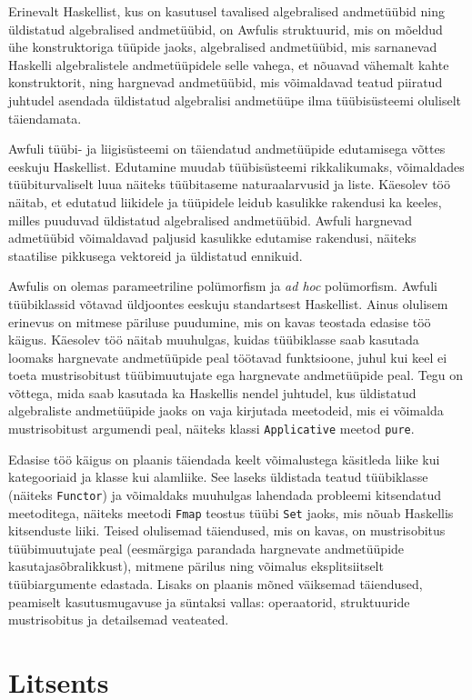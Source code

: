 \documentclass[12pt]{article}
\renewcommand\refname{Viidatud kirjandus}}
\newcommand\peatykktarn[1]{
  \clearpage
  \section*{#1}
  \addcontentsline{toc}{section}{#1}}
\begin{document}
    Erinevalt Haskellist, kus on kasutusel tavalised algebralised andmetüübid ning üldistatud algebralised andmetüübid, on Awfulis struktuurid, mis on mõeldud ühe konstruktoriga tüüpide jaoks, algebralised andmetüübid, mis sarnanevad Haskelli algebralistele andmetüüpidele selle vahega, et nõuavad vähemalt kahte konstruktorit, ning hargnevad andmetüübid, mis võimaldavad teatud piiratud juhtudel asendada üldistatud algebralisi andmetüüpe ilma tüübisüsteemi oluliselt täiendamata.

    Awfuli tüübi- ja liigisüsteemi on täiendatud andmetüüpide edutamisega võttes eeskuju Haskellist. Edutamine muudab tüübisüsteemi rikkalikumaks, võimaldades tüübiturvaliselt luua näiteks tüübitaseme naturaalarvusid ja liste. Käesolev töö näitab, et edutatud liikidele ja tüüpidele leidub kasulikke rakendusi ka keeles, milles puuduvad üldistatud algebralised andmetüübid. Awfuli hargnevad admetüübid võimaldavad paljusid kasulikke edutamise rakendusi, näiteks staatilise pikkusega vektoreid ja üldistatud ennikuid.

    Awfulis on olemas parameetriline polümorfism ja \textit{ad hoc} polümorfism. Awfuli tüübiklassid võtavad üldjoontes eeskuju standartsest Haskellist. Ainus olulisem erinevus on mitmese päriluse puudumine, mis on kavas teostada edasise töö käigus. Käesolev töö näitab muuhulgas, kuidas tüübiklasse saab kasutada loomaks hargnevate andmetüüpide peal töötavad funktsioone, juhul kui keel ei toeta mustrisobitust tüübimuutujate ega hargnevate andmetüüpide peal. Tegu on võttega, mida saab kasutada ka Haskellis nendel juhtudel, kus üldistatud algebraliste andmetüüpide jaoks on vaja kirjutada meetodeid, mis ei võimalda mustrisobitust argumendi peal, näiteks klassi \verb!Applicative! meetod \verb!pure!.

    Edasise töö käigus on plaanis täiendada keelt võimalustega käsitleda liike kui kategooriaid ja klasse kui alamliike. See laseks üldistada teatud tüübiklasse (näiteks \verb!Functor!) ja võimaldaks muuhulgas lahendada probleemi kitsendatud meetoditega, näiteks meetodi \verb!Fmap! teostus tüübi \verb!Set! jaoks, mis nõuab Haskellis kitsenduste liiki. Teised olulisemad täiendused, mis on kavas, on mustrisobitus tüübimuutujate peal (eesmärgiga parandada hargnevate andmetüüpide kasutajasõbralikkust), mitmene pärilus ning võimalus eksplitsiitselt tüübiargumente edastada. Lisaks on plaanis mõned väiksemad täiendused, peamiselt kasutusmugavuse ja süntaksi vallas: operaatorid, struktuuride mustrisobitus ja detailsemad veateated.
  \newpage
  \addcontentsline{toc}{section}{\refname}
  
  \peatykktarn{Litsents}
\end{document}
